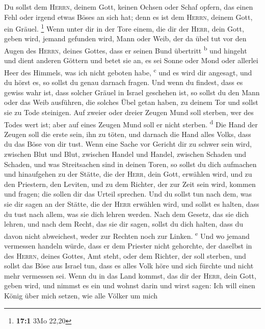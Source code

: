  Du sollst dem \textsc{Herrn}, deinem Gott, keinen Ochsen
oder Schaf opfern, das einen Fehl oder irgend etwas Böses an sich hat;
denn es ist dem \textsc{Herrn}, deinem Gott, ein Gräuel. \footnote{\textbf{17:1}
  3Mo 22,20}  Wenn unter dir in der Tore einem, die dir
der \textsc{Herr}, dein Gott, geben wird, jemand gefunden wird, Mann
oder Weib, der da übel tut vor den Augen des \textsc{Herrn}, deines
Gottes, dass er seinen Bund übertritt \textsuperscript{b} 
und hingeht und dient anderen Göttern und betet sie an, es sei Sonne
oder Mond oder allerlei Heer des Himmels, was ich nicht geboten habe,
\textsuperscript{c}  und es wird dir angesagt, und du
hörst es, so sollst du genau darnach fragen. Und wenn du findest, dass
es gewiss wahr ist, dass solcher Gräuel in Israel geschehen ist,
 so sollst du den Mann oder das Weib ausführen, die
solches Übel getan haben, zu deinem Tor und sollst sie zu Tode
steinigen.  Auf zweier oder dreier Zeugen Mund soll
sterben, wer des Todes wert ist; aber auf eines Zeugen Mund soll er
nicht sterben. \textsuperscript{d}  Die Hand der Zeugen
soll die erste sein, ihn zu töten, und darnach die Hand alles Volks,
dass du das Böse von dir tust.  Wenn eine Sache vor
Gericht dir zu schwer sein wird, zwischen Blut und Blut, zwischen Handel
und Handel, zwischen Schaden und Schaden, und was Streitsachen sind in
deinen Toren, so sollst du dich aufmachen und hinaufgehen zu der Stätte,
die der \textsc{Herr}, dein Gott, erwählen wird,  und zu
den Priestern, den Leviten, und zu dem Richter, der zur Zeit sein wird,
kommen und fragen; die sollen dir das Urteil sprechen. 
Und du sollst tun nach dem, was sie dir sagen an der Stätte, die der
\textsc{Herr} erwählen wird, und sollst es halten, dass du tust nach
allem, was sie dich lehren werden.  Nach dem Gesetz, das
sie dich lehren, und nach dem Recht, das sie dir sagen, sollst du dich
halten, dass du davon nicht abweichest, weder zur Rechten noch zur
Linken. \textsuperscript{e}  Und wo jemand vermessen
handeln würde, dass er dem Priester nicht gehorchte, der daselbst in des
\textsc{Herrn}, deines Gottes, Amt steht, oder dem Richter, der soll
sterben, und sollst das Böse aus Israel tun,  dass es
alles Volk höre und sich fürchte und nicht mehr vermessen sei.
 Wenn du in das Land kommst, das dir der \textsc{Herr},
dein Gott, geben wird, und nimmst es ein und wohnst darin und wirst
sagen: Ich will einen König über mich setzen, wie alle Völker um mich
